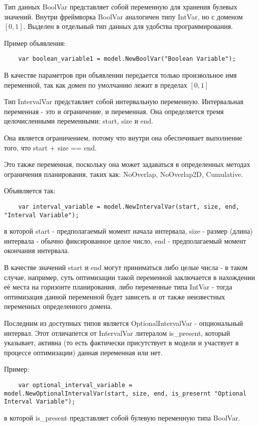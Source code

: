 Тип данных BoolVar представляет собой переменную для хранения булевых значений. Внутри фреймворка BoolVar аналогичен типу IntVar, но с доменом $[0, 1]$. Выделен в отдельный тип данных для удобства программирования.

Пример объявления:
\begin{lstlisting}
	var boolean_variable1 = model.NewBoolVar("Boolean Variable");
\end{lstlisting}
В качестве параметров при объявлении передается только произвольное имя переменной, так как домен по умолчанию лежит в пределах $[0, 1]$

Тип IntervalVar представляет собой интервальную переменную. Интервальная переменная - это и ограничение, и переменная. Она определяется тремя целочисленными переменными: start, size и end.

Она является ограничением, потому что внутри она обеспечивает выполнение того, что start + size == end.

Это также переменная, поскольку она может задаваться в определенных методах ограничения планирования, таких как: NoOverlap, NoOverlap2D, Cumulative.

Объявляется так:
\begin{lstlisting}
	var interval_variable = model.NewIntervalVar(start, size, end, "Interval Variable");
\end{lstlisting}
в которой start - предполагаемый момент начала интервала, size - размер (длина) интервала - обычно фиксированное целое число, end - предполагаемый момент окончания интервала. 

В качестве значений start и end могут приниматься либо целые числа - в таком случае, например, суть оптимизации такой переменной заключается в нахождении её места на горизонте планирования, либо переменные типа IntVar - тогда оптимизация данной переменной будет зависеть и от также неизвестных переменных определенного домена.

Последним из доступных типов является OptionalIntervalVar - опциональный интервал. Этот отличапется от IntervalVar литералом is\_present, который указывает, активна (то есть фактически присутствует в модели и участвует в процессе оптимизации) данная переменная или нет.

Пример:
\begin{lstlisting}
	var optional_interval_variable = model.NewOptionalIntervalVar(start, size, end, is_presernt "Optional Interval Variable");
\end{lstlisting}
в которой is\_present представляет собой булевую переменную типа BoolVar.

